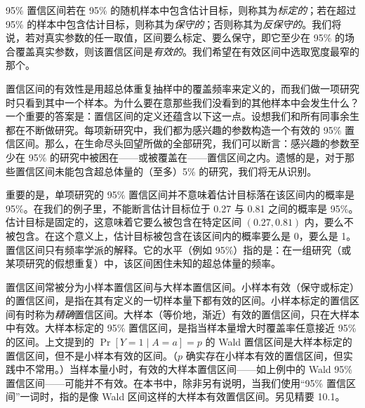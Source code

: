 
95\% 置信区间若在 95\% 的随机样本中包含估计目标，则称其为\emph{标定的}；若在超过 95\% 的样本中包含估计目标，则称其为\emph{保守的}；否则称其为\emph{反保守的}。我们将说，若对真实参数的任一取值，区间要么标定、要么保守，即它至少在 95\% 的场合覆盖真实参数，则该置信区间是\emph{有效的}。我们希望在有效区间中选取宽度最窄的那个。

置信区间的有效性是用超总体重复抽样中的覆盖频率来定义的，而我们做一项研究时只看到其中一个样本。为什么要在意那些我们没看到的其他样本中会发生什么？一个重要的答案是：置信区间的定义还蕴含以下这一点。设想我们和所有同事余生都在不断做研究。每项新研究中，我们都为感兴趣的参数构造一个有效的 95\% 置信区间。那么，在生命尽头回望所做的全部研究，我们可以断言：感兴趣的参数至少在 95\% 的研究中被困在——或被覆盖在——置信区间之内。遗憾的是，对于那些置信区间未能包含超总体量的（至多）5\% 的研究，我们将无从识别。

重要的是，单项研究的 95\% 置信区间并不意味着估计目标落在该区间内的概率是 95\%。在我们的例子里，不能断言估计目标位于 0.27 与 0.81 之间的概率是 95\%。估计目标是固定的，这意味着它要么被包含在特定区间 $(0.27,0.81)$ 内，要么不被包含。在这个意义上，估计目标被包含在该区间内的概率要么是 0，要么是 1。置信区间只有频率学派的解释。它的水平（例如 95\%）指的是：在一组研究（或某项研究的假想重复）中，该区间困住未知的超总体量的频率。


置信区间常被分为小样本置信区间与大样本置信区间。小样本有效（保守或标定）的置信区间，是指在其有定义的一切样本量下都有效的区间。小样本标定的置信区间有时称为\emph{精确}置信区间。大样本（等价地，渐近）有效的置信区间，只在大样本中有效。大样本标定的 95\% 置信区间，是指当样本量增大时覆盖率任意接近 95\% 的区间。上文提到的 $\Pr[Y=1\mid A=a]=p$ 的 Wald 置信区间是大样本标定的置信区间，但不是小样本有效的区间。（$p$ 确实存在小样本有效的置信区间，但实践中不常用。）当样本量小时，有效的大样本置信区间——如上例中的 Wald 95\% 置信区间——可能并不有效。在本书中，除非另有说明，当我们使用“95\% 置信区间”一词时，指的是像 Wald 区间这样的大样本有效置信区间。另见精要 10.1。


